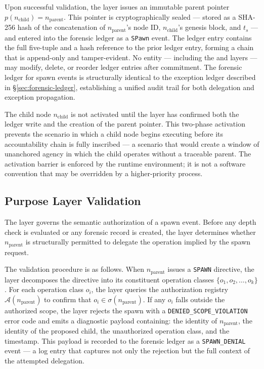 Upon successful validation, the \fact{} layer issues an immutable parent pointer $p(n_{\text{child}}) = n_{\text{parent}}$. This pointer is cryptographically sealed — stored as a SHA-256 hash of the concatenation of $n_{\text{parent}}$'s node ID, $n_{\text{child}}$'s genesis block, and $t_s$ — and entered into the forensic ledger as a \texttt{SPawn} event. The ledger entry contains the full five-tuple and a hash reference to the prior ledger entry, forming a chain that is append-only and tamper-evident. No entity — including the \purpose{} and \bounds{} layers — may modify, delete, or reorder ledger entries after commitment. The forensic ledger for spawn events is structurally identical to the exception ledger described in \S\ref{sec:forensic-ledger}, establishing a unified audit trail for both delegation and exception propagation.

The child node $n_{\text{child}}$ is not activated until the \fact{} layer has confirmed both the ledger write and the creation of the parent pointer. This two-phase activation prevents the scenario in which a child node begins executing before its accountability chain is fully inscribed — a scenario that would create a window of unanchored agency in which the child operates without a traceable parent. The activation barrier is enforced by the runtime environment; it is not a software convention that may be overridden by a higher-priority process.

\subsection{Purpose Layer Validation}\label{sec:purpose-layer-validation}

The \purpose{} layer governs the semantic authorization of a spawn event. Before any depth check is evaluated or any forensic record is created, the \purpose{} layer determines whether $n_{\text{parent}}$ is structurally permitted to delegate the operation implied by the spawn request.

The validation procedure is as follows. When $n_{\text{parent}}$ issues a \texttt{SPAWN} directive, the \purpose{} layer decomposes the directive into its constituent operation classes $\{o_1, o_2, \ldots, o_k\}$. For each operation class $o_i$, the \purpose{} layer queries the authorization registry $\mathcal{A}(n_{\text{parent}})$ to confirm that $o_i \in \sigma(n_{\text{parent}})$. If any $o_i$ falls outside the authorized scope, the \purpose{} layer rejects the spawn with a \texttt{DENIED\_SCOPE\_VIOLATION} error code and emits a diagnostic payload containing: the identity of $n_{\text{parent}}$, the identity of the proposed child, the unauthorized operation class, and the timestamp. This payload is recorded to the forensic ledger as a \texttt{SPAWN\_DENIAL} event — a log entry that captures not only the rejection but the full context of the attempted delegation.

